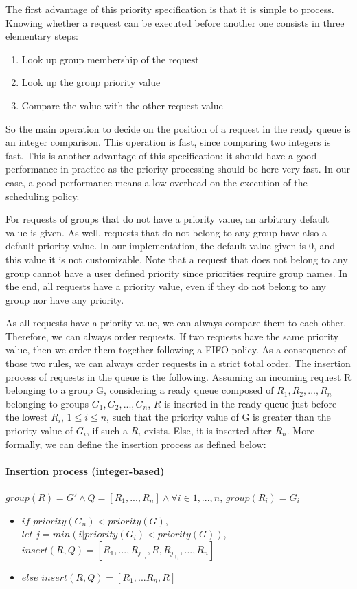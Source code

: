 \documentclass[11pt]{report}
\begin{document}
The first advantage of this priority specification is that it is simple  to process. Knowing whether a request can be executed before another one consists in three elementary steps:

\begin{enumerate}
\item Look up group membership of the request
\item Look up the group priority value
\item Compare the value with the other request value
\end{enumerate}

So the main operation to decide on the position of a request in the ready queue is an integer comparison. This operation is fast, since comparing two integers is fast. This is another advantage of this specification: it should have a good performance in practice as the priority processing should be here very fast. In our case, a good performance means a low overhead on the execution of the scheduling policy.

For requests of groups that do not have a priority value, an arbitrary default value is given. As well, requests that do not belong to any group have also a default priority value. In our implementation, the default value given is 0, and this value it is not customizable. 
Note that a request that does not belong to any group cannot have a user defined priority since priorities require group names. In the end, all requests have a priority value, even if they do not belong to any group nor have any priority. 


As all requests have a priority value, we can always compare them to each other. Therefore, we can always order requests. If two requests have the same priority value, then we order them together following a FIFO policy. As a consequence of those two rules, we can always order requests in a strict total order.
The insertion process of requests in the queue is the following. Assuming an incoming request R belonging to a group G, considering a ready queue composed of $R_1,R_2,...,R_n$ belonging to groups $G_1,G_2,...,G_n$, $R$ is  inserted in the ready queue just before the lowest $R_i$, $1 \le i \le n$, such that the priority value of G is greater than the priority value of $G_i$, if such a $R_i$ exists. Else, it is inserted after $R_n$.
More formally, we can define the insertion process as defined below:
\paragraph{Insertion process (integer-based)}
$group(R)=G' \wedge Q=[R_1,...,R_n] \wedge \forall i \in 1,...,n$, $group(R_i)=G_i$
\begin{itemize}
\item $if$ $priority(G_n) < priority(G)$,\\$let$ $j=min({i| priority(G_i) < priority(G)})$, $insert(R, Q)=[R_1,...,R_j_-_1,R,R_j_+_1,...,R_n]$
\item $else$ $insert(R,Q)=[R_1,...R_n,R]$
\end{itemize}
\end{document}
